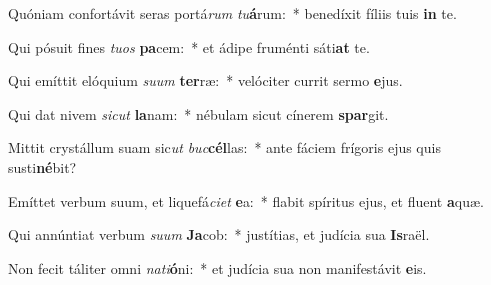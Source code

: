 \item Quóniam confortávit seras portá\textit{rum} \textit{tu}\textbf{á}rum:~* benedíxit fíliis tuis \textbf{in} te.
\item Qui pósuit fines \textit{tu}\textit{os} \textbf{pa}cem:~* et ádipe fruménti sáti\textbf{at} te.
\item Qui emíttit elóquium \textit{su}\textit{um} \textbf{ter}ræ:~* velóciter currit sermo \textbf{e}jus.
\item Qui dat nivem \textit{sic}\textit{ut} \textbf{la}nam:~* nébulam sicut cínerem \textbf{spar}git.
\item Mittit crystállum suam sic\textit{ut} \textit{buc}\textbf{cél}las:~* ante fáciem frígoris ejus quis susti\textbf{né}bit?
\item Emíttet verbum suum, et liquefá\textit{ci}\textit{et} \textbf{e}a:~* flabit spíritus ejus, et fluent \textbf{a}quæ.
\item Qui annúntiat verbum \textit{su}\textit{um} \textbf{Ja}cob:~* justítias, et judícia sua \textbf{Is}raël.
\item Non fecit táliter omni \textit{na}\textit{ti}\textbf{ó}ni:~* et judícia sua non manifestávit \textbf{e}is.
